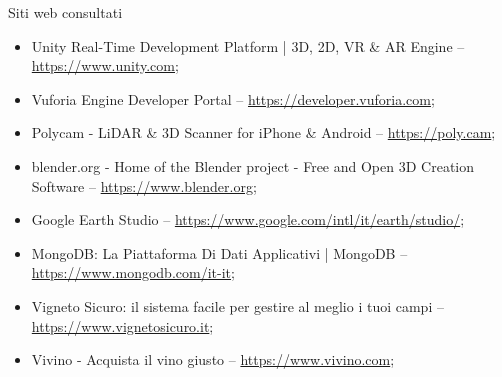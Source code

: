 \cleardoublepage
{}
{}
\nocite{*}


%

\vspace{4cm}
\begin{Large}Siti web consultati\end{Large}
\begin{itemize}
    \item Unity Real-Time Development Platform | 3D, 2D, VR \& AR Engine -- \url{https://www.unity.com};
    \item Vuforia Engine Developer Portal -- \url{https://developer.vuforia.com};
    \item Polycam - LiDAR \& 3D Scanner for iPhone \& Android -- \url{https://poly.cam};
    \item blender.org - Home of the Blender project - Free and Open 3D Creation Software -- \url{https://www.blender.org};
    \item Google Earth Studio -- \url{https://www.google.com/intl/it/earth/studio/};
    \item MongoDB: La Piattaforma Di Dati Applicativi | MongoDB -- \url{https://www.mongodb.com/it-it};
    \item Vigneto Sicuro: il sistema facile per gestire al meglio i tuoi campi -- \url{https://www.vignetosicuro.it};
    \item Vivino - Acquista il vino giusto -- \url{https://www.vivino.com};
\end{itemize}

